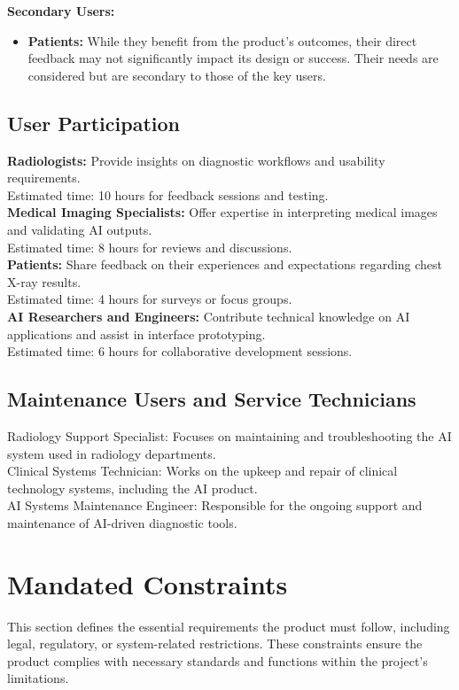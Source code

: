 \documentclass[12pt]{article}
\begin{document}
\noindent
\textbf{Secondary Users:}
\begin{itemize}
    \item{
        \textbf{Patients: } While they benefit from the product's outcomes, their direct feedback 
        may not significantly impact its design or success. Their needs are considered but are 
        secondary to those of the key users.
    }
\end{itemize}

\subsection{User Participation}
\textbf{Radiologists: } Provide insights on diagnostic workflows and usability requirements. \\
Estimated time: 10 hours for feedback sessions and testing.
\\
\noindent
\textbf{Medical Imaging Specialists: }Offer expertise in interpreting medical images and 
validating AI outputs. \\
Estimated time: 8 hours for reviews and discussions.
\\
\noindent
\textbf{Patients:} Share feedback on their experiences and expectations regarding chest X-ray 
results. \\
Estimated time: 4 hours for surveys or focus groups.
\\
\noindent
\textbf{AI Researchers and Engineers:} Contribute technical knowledge on AI applications and 
assist in interface prototyping. \\
Estimated time: 6 hours for collaborative development sessions.


\subsection{Maintenance Users and Service Technicians}
Radiology Support Specialist: Focuses on maintaining and troubleshooting the AI system used in 
radiology departments.
\\
\noindent
Clinical Systems Technician: Works on the upkeep and repair of clinical technology systems, 
including the AI product.
\\
\noindent
AI Systems Maintenance Engineer: Responsible for the ongoing support and maintenance of AI-driven 
diagnostic tools.

\section{Mandated Constraints}
This section defines the essential requirements the product must follow, including legal, 
regulatory, or system-related restrictions. These constraints ensure the product complies with 
necessary standards and functions within the project's limitations.
\end{document}

